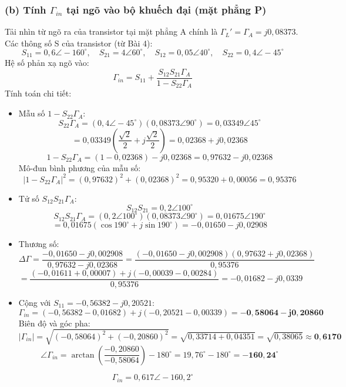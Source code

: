 \documentclass[12pt,a4paper]{article}
\begin{document}
\subsubsection{(b) Tính $\Gamma_{in}$ tại ngõ vào bộ khuếch đại (mặt phẳng P)}
Tải nhìn từ ngõ ra của transistor tại mặt phẳng A chính là $\Gamma_L' = \Gamma_A = j 0{,}08373$.
Các thông số S của transistor (từ Bài 4):
\[
S_{11} = 0{,}6\angle -160^\circ, \quad S_{21} = 4\angle 60^\circ, \quad S_{12} = 0{,}05\angle 40^\circ, \quad S_{22} = 0{,}4\angle -45^\circ
\]
Hệ số phản xạ ngõ vào:
\[
\Gamma_{in} = S_{11} + \frac{S_{12}S_{21}\Gamma_A}{1 - S_{22}\Gamma_A}
\]
Tính toán chi tiết:
\begin{itemize}
    \item Mẫu số $1 - S_{22}\Gamma_A$:
    \[
    S_{22}\Gamma_A = (0{,}4\angle -45^\circ)(0{,}08373\angle 90^\circ) = 0{,}03349 \angle 45^\circ
    \]
    \[
    = 0{,}03349\left(\frac{\sqrt{2}}{2} + j\frac{\sqrt{2}}{2}\right) = 0{,}02368 + j0{,}02368
    \]
    \[
    1 - S_{22}\Gamma_A = (1 - 0{,}02368) - j0{,}02368 = 0{,}97632 - j0{,}02368
    \]
    Mô-đun bình phương của mẫu số:
    \[
    |1 - S_{22}\Gamma_A|^2 = (0{,}97632)^2 + (0{,}02368)^2 = 0{,}95320 + 0{,}00056 = 0{,}95376
    \]
    \item Tử số $S_{12}S_{21}\Gamma_A$:
    \[
    S_{12}S_{21} = 0{,}2 \angle 100^\circ
    \]
    \[
    S_{12}S_{21}\Gamma_A = (0{,}2\angle 100^\circ)(0{,}08373\angle 90^\circ) = 0{,}01675 \angle 190^\circ
    \]
    \[
    = 0{,}01675(\cos 190^\circ + j\sin 190^\circ) = -0{,}01650 - j0{,}02908
    \]
    \item Thương số:
    \[
    \Delta \Gamma = \frac{-0{,}01650 - j0{,}002908}{0{,}97632 - j0{,}02368} = \frac{(-0{,}01650 - j0{,}002908)(0{,}97632 + j0{,}02368)}{0{,}95376}
    \]
    \[
    = \frac{(-0{,}01611 + 0{,}00007) + j(-0{,}00039 - 0{,}00284)}{0{,}95376} = -0{,}01682 - j0{,}0339
    \]
    \item Cộng với $S_{11} = -0{,}56382 - j0{,}20521$:
    \[
    \Gamma_{in} = (-0{,}56382 - 0{,}01682) + j(-0{,}20521 - 0{,}00339) = \mathbf{-0{,}58064 - j0{,}20860}
    \]
    Biên độ và góc pha:
    \[
    |\Gamma_{in}| = \sqrt{(-0{,}58064)^2 + (-0{,}20860)^2} = \sqrt{0{,}33714 + 0{,}04351} = \sqrt{0{,}38065} \approx \mathbf{0{,}6170}
    \]
    \[
    \angle \Gamma_{in} = \arctan\left(\frac{-0{,}20860}{-0{,}58064}\right) - 180^\circ = 19{,}76^\circ - 180^\circ = \mathbf{-160{,}24^\circ}
    \]
\end{itemize}
\[
\boxed{\Gamma_{in} = 0{,}617 \angle -160{,}2^\circ}
\]
\end{document}
